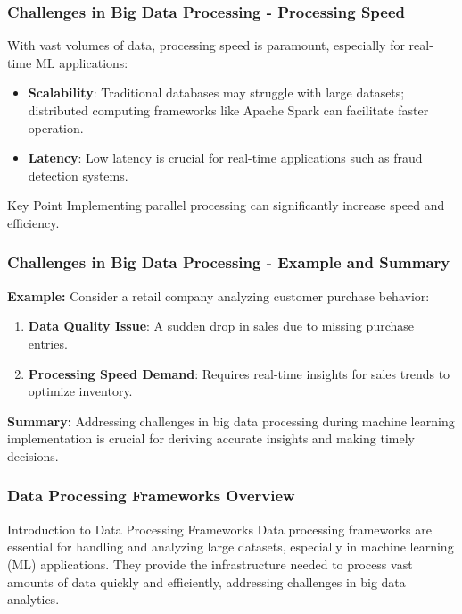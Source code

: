 \documentclass[aspectratio=169]{beamer}
\begin{document}
\begin{frame}[fragile]
    \frametitle{Challenges in Big Data Processing - Processing Speed}
    With vast volumes of data, processing speed is paramount, especially for real-time ML applications:

    \begin{itemize}
        \item \textbf{Scalability}: Traditional databases may struggle with large datasets; distributed computing frameworks like Apache Spark can facilitate faster operation.
        \item \textbf{Latency}: Low latency is crucial for real-time applications such as fraud detection systems.
    \end{itemize}

    \begin{block}{Key Point}
        Implementing parallel processing can significantly increase speed and efficiency.
    \end{block}
\end{frame}

\begin{frame}[fragile]
    \frametitle{Challenges in Big Data Processing - Example and Summary}
    \textbf{Example:}
    Consider a retail company analyzing customer purchase behavior:
    \begin{enumerate}
        \item \textbf{Data Quality Issue}: A sudden drop in sales due to missing purchase entries.
        \item \textbf{Processing Speed Demand}: Requires real-time insights for sales trends to optimize inventory.
    \end{enumerate}

    \textbf{Summary:} 
    Addressing challenges in big data processing during machine learning implementation is crucial for deriving accurate insights and making timely decisions. 
     
\end{frame}

\begin{frame}[fragile]
    \frametitle{Data Processing Frameworks Overview}
    \begin{block}{Introduction to Data Processing Frameworks}
        Data processing frameworks are essential for handling and analyzing large datasets, especially in machine learning (ML) applications. They provide the infrastructure needed to process vast amounts of data quickly and efficiently, addressing challenges in big data analytics.
    \end{block}
\end{frame}
\end{document}
